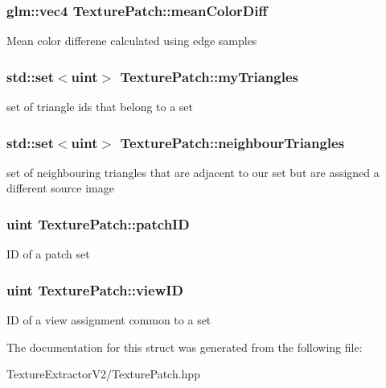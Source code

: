 \subsubsection[{mean\+Color\+Diff}]{\setlength{\rightskip}{0pt plus 5cm}glm\+::vec4 Texture\+Patch\+::mean\+Color\+Diff}\label{struct_texture_patch_a1285c94f40ae56464f33eaf69fb93617}
Mean color differene calculated using edge samples \hypertarget{struct_texture_patch_a6508eab52b765ffa3f5b185956334f47}{}
\subsubsection[{my\+Triangles}]{\setlength{\rightskip}{0pt plus 5cm}std\+::set$<$uint$>$ Texture\+Patch\+::my\+Triangles}\label{struct_texture_patch_a6508eab52b765ffa3f5b185956334f47}
set of triangle ids that belong to a set \hypertarget{struct_texture_patch_a002b3455ab2599b42b78c34c1d887f94}{}
\subsubsection[{neighbour\+Triangles}]{\setlength{\rightskip}{0pt plus 5cm}std\+::set$<$uint$>$ Texture\+Patch\+::neighbour\+Triangles}\label{struct_texture_patch_a002b3455ab2599b42b78c34c1d887f94}
set of neighbouring triangles that are adjacent to our set but are assigned a different source image \hypertarget{struct_texture_patch_a359bb72c7d9793ff22e9d6272b016521}{}
\subsubsection[{patch\+I\+D}]{\setlength{\rightskip}{0pt plus 5cm}uint Texture\+Patch\+::patch\+I\+D}\label{struct_texture_patch_a359bb72c7d9793ff22e9d6272b016521}
I\+D of a patch set \hypertarget{struct_texture_patch_a97acb0ad9531af6cc0c366640d3575e1}{}
\subsubsection[{view\+I\+D}]{\setlength{\rightskip}{0pt plus 5cm}uint Texture\+Patch\+::view\+I\+D}\label{struct_texture_patch_a97acb0ad9531af6cc0c366640d3575e1}
I\+D of a view assignment common to a set 

The documentation for this struct was generated from the following file\+:\begin{DoxyCompactItemize}
\item 
Texture\+Extractor\+V2/Texture\+Patch.\+hpp\end{DoxyCompactItemize}
